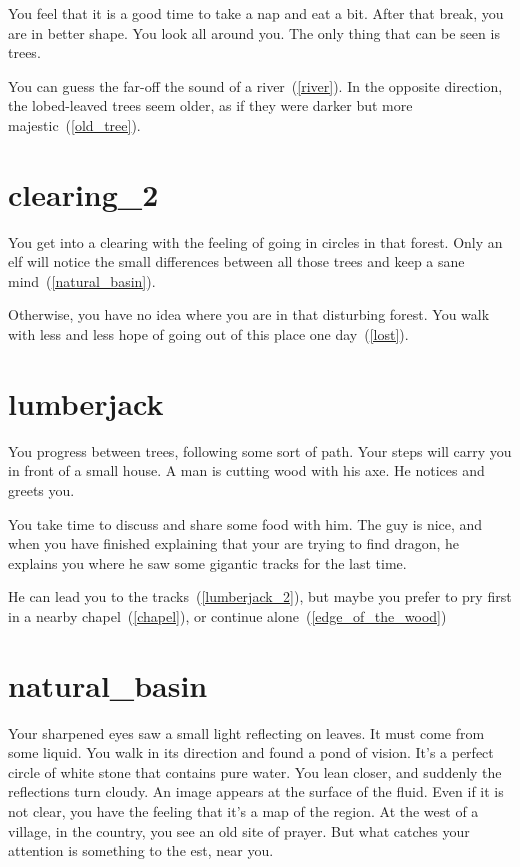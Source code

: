 You feel that it is a good time to take a nap and eat a bit. After that
break, you are in better shape. You look all around you. The only thing that can
be seen is trees.

You can guess the far-off the sound of a river~(\ref{river}). In the opposite
direction, the lobed-leaved trees seem older, as if they were darker but more
majestic~(\ref{old_tree}).

\section{clearing_2}

You get into a clearing with the feeling of going in circles in that forest.
Only an elf will notice the small differences between all those trees and keep a
sane mind~(\ref{natural_basin}).

Otherwise, you have no idea where you are in that disturbing forest. You walk
with less and less hope of going out of this place one day~(\ref{lost}).

\section{lumberjack}

You progress between trees, following some sort of path. Your steps will carry
you in front of a small house. A man is cutting wood with his axe. He notices
and greets you.

You take time to discuss and share some food with him. The guy is nice, and when
you have finished explaining that your are trying to find dragon, he explains
you where he saw some gigantic tracks for the last time.

He can lead you to the tracks~(\ref{lumberjack_2}), but maybe you prefer to pry
first in a nearby chapel~(\ref{chapel}), or continue alone~(\ref{edge_of_the_wood})

\section{natural_basin}

Your sharpened eyes saw a small light reflecting on leaves. It must come from some
liquid. You walk in its direction and found a pond of vision. It's a perfect
circle of white stone that contains pure water. You lean closer, and suddenly the
reflections turn cloudy. An image appears at the surface of the fluid. Even if it
is not clear, you have the feeling that it's a map of the region. At the west of
a village, in the country, you see an old site of prayer. But what catches your
attention is something to the est, near you.


